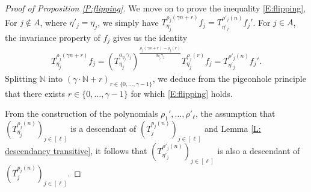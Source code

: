 \documentclass[11pt]{amsart}
\theoremstyle{definition}
\newcommand{\N}{{\mathbb N}}
\newcommand{\brac}[1]{\mathopen{}\left( #1 \mathclose{}\right)}
\begin{document}
\begin{proof}[Proof of Proposition \ref{P:flipping}]
We move on to prove the inequality \eqref{E:flipping}, For $j\notin A$, where $\eta'_j = \eta_j$, we simply have $T_{\eta_j}^{\rho_j(\gamma n+r)}f_j = T_{\eta'_j}^{\rho'_j(n)}f_j'$. For $j\in A$, the invariance property of $f_j$ gives us the identity
\begin{align*}
    T_{\eta_j}^{\rho_j(\gamma n+r)}f_j = \brac{T_{\eta_j}^{a_{\eta_j}\gamma_j}}^{\frac{\rho_j(\gamma n+r)-\rho_j(r)}{a_{\eta_j}\gamma_j}} T_{\eta_j}^{\rho_j(r)} f_j
    =  T_{\eta'_j}^{\rho'_j(n)}f_j'.
\end{align*}
Splitting $\N$ into $(\gamma\cdot\N + r)_{r\in\{0, \ldots, \gamma-1\}}$, we deduce from the pigeonhole principle that there exists $r\in\{0, \ldots, \gamma-1\}$ for which \eqref{E:flipping} holds.

From the construction of the polynomials $\rho_1', \ldots, \rho'_\ell$, the assumption that $\brac{T_{\eta_j}^{\rho_j(n)}}_{j\in[\ell]}$ is a descendant of $\brac{T_j^{p_j(n)}}_{j\in[\ell]}$ and Lemma \ref{L: descendancy transitive}, it follows that $\brac{T_{\eta'_j}^{\rho'_j(n)}}_{j\in[\ell]}$ is also a descendant of $\brac{T_j^{p_j(n)}}_{j\in[\ell]}$.
\end{proof}
\end{document}
